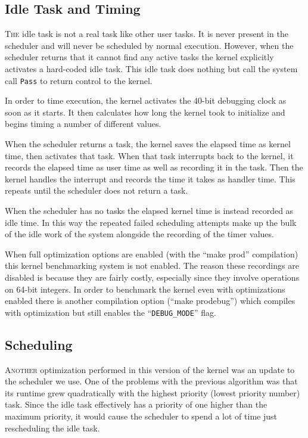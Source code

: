 \documentclass{amsart}
\begin{document}
\subsection*{Idle Task and Timing}

\textsc{The} idle task is not a real task like other user tasks. It is never
present in the scheduler and will never be scheduled by normal execution.
However, when the scheduler returns that it cannot find any active tasks the
kernel explicitly activates a hard-coded idle task. This idle task does nothing
but call the system call \texttt{Pass} to return control to the kernel.

In order to time execution, the kernel activates the 40-bit debugging clock as
soon as it starts. It then calculates how long the kernel took to initialize and
begins timing a number of different values.

When the scheduler returns a task, the kernel saves the elapsed time as kernel
time, then activates that task. When that task interrupts back to the kernel, it
records the elapsed time as user time as well as recording it in the task. Then
the kernel handles the interrupt and records the time it takes as handler time.
This repeats until the scheduler does not return a task.

When the scheduler has no tasks the elapsed kernel time is instead recorded as
idle time. In this way the repeated failed scheduling attempts make up the bulk
of the idle work of the system alongside the recording of the timer values.

When full optimization options are enabled (with the ``make prod'' compilation)
this kernel benchmarking system is not enabled. The reason these recordings are
disabled is because they are fairly costly, especially since they involve
operations on 64-bit integers. In order to benchmark the kernel even with
optimizations enabled there is another compilation option (``make prodebug'')
which compiles with optimization but still enables the ``\texttt{DEBUG\_MODE}''
flag.

\subsection*{Scheduling}

\textsc{Another} optimization performed in this version of the kernel was an
update to the scheduler we use. One of the problems with the previous algorithm
was that its runtime grew quadratically with the highest priority (lowest
priority number) task. Since the idle task effectively has a priority of one
higher than the maximum priority, it would cause the scheduler to spend a lot of
time just rescheduling the idle task.
\end{document}
